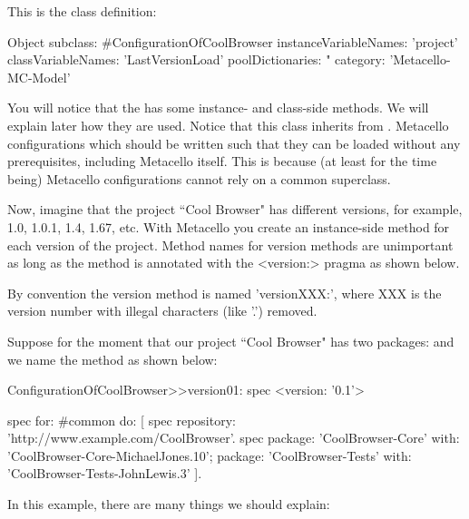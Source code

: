 \documentclass[a4paper,10pt,twoside]{book}
\begin{document}
This is the class definition:
\begin{code}{}
Object subclass: #ConfigurationOfCoolBrowser
	instanceVariableNames: 'project'
	classVariableNames: 'LastVersionLoad'
	poolDictionaries: "
	category: 'Metacello-MC-Model'
\end{code}

You will notice that the  has some instance- and class-side methods. We will explain later how they are used. Notice that this class inherits from .  Metacello configurations which should be written such that they can be loaded without any prerequisites, including Metacello itself. This is because (at least for the time being) Metacello configurations cannot rely on a common superclass.

Now, imagine that the project ``Cool Browser" has different versions, for example, 1.0, 1.0.1, 1.4, 1.67, etc. 
With Metacello you create an instance-side method for each version of the project. Method names for version methods are unimportant as long as the method is annotated with the <version:> pragma as shown below.

By convention the version method is named 'versionXXX:', where XXX is the version number with illegal characters (like '.') removed.

Suppose for the moment that our project ``Cool Browser" has two packages:  and  we name the method  as shown below:

\begin{code}{}
ConfigurationOfCoolBrowser>>version01: spec 
	<version: '0.1'>
	
	spec for: #common do: [
		spec repository: 'http://www.example.com/CoolBrowser'.
		spec 
			package: 'CoolBrowser-Core' with: 'CoolBrowser-Core-MichaelJones.10';
			package: 'CoolBrowser-Tests' with: 'CoolBrowser-Tests-JohnLewis.3' ].
\end{code}


In this example, there are many things we should explain:
\end{document}
